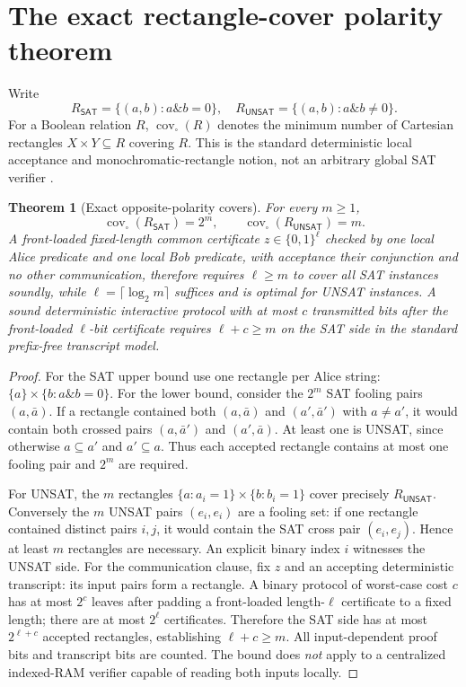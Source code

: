 \documentclass[11pt]{article}
\newtheorem{theorem}{Theorem}
\newcommand{\SAT}{\mathsf{SAT}}
\newcommand{\UNSAT}{\mathsf{UNSAT}}
\begin{document}
\section{The exact rectangle-cover polarity theorem}
Write
\[
R_{\SAT}=\{(a,b):a\mathbin{\&}b=0\},\quad
R_{\UNSAT}=\{(a,b):a\mathbin{\&}b\ne0\}.
\]
For a Boolean relation $R$, $\operatorname{cov}_{\square}(R)$ denotes the minimum number of Cartesian rectangles $X\times Y\subseteq R$ covering $R$. This is the standard deterministic local acceptance and monochromatic-rectangle notion, not an arbitrary global SAT verifier \cite{KarchmerKushilevitzNisan1995}.
\begin{theorem}[Exact opposite-polarity covers]\label{th:rect}
For every $m\ge1$,
\[
\boxed{\operatorname{cov}_{\square}(R_{\SAT})=2^m,\qquad
\operatorname{cov}_{\square}(R_{\UNSAT})=m.}\tag{3}
\]
A front-loaded fixed-length common certificate $z\in\{0,1\}^{\ell}$ checked by one local Alice predicate and one local Bob predicate, with acceptance their conjunction and no other communication, therefore requires $\ell\ge m$ to cover \emph{all SAT} instances soundly, while $\ell=\lceil\log_2m\rceil$ suffices and is optimal for \emph{UNSAT} instances. A sound deterministic interactive protocol with at most $c$ transmitted bits after the front-loaded $\ell$-bit certificate requires $\ell+c\ge m$ on the SAT side in the standard prefix-free transcript model.
\end{theorem}
\begin{proof}
For the SAT upper bound use one rectangle per Alice string:
$\{a\}\times\{b:a\mathbin{\&}b=0\}$. For the lower bound, consider the $2^m$ SAT fooling pairs $(a,\bar a)$. If a rectangle contained both $(a,\bar a)$ and $(a',\bar a')$ with $a\ne a'$, it would contain both crossed pairs $(a,\bar a')$ and $(a',\bar a)$. At least one is UNSAT, since otherwise $a\subseteq a'$ and $a'\subseteq a$. Thus each accepted rectangle contains at most one fooling pair and $2^m$ are required.

For UNSAT, the $m$ rectangles
$\{a:a_i=1\}\times\{b:b_i=1\}$ cover precisely $R_{\UNSAT}$. Conversely the $m$ UNSAT pairs $(e_i,e_i)$ are a fooling set: if one rectangle contained distinct pairs $i,j$, it would contain the SAT cross pair $(e_i,e_j)$. Hence at least $m$ rectangles are necessary. An explicit binary index $i$ witnesses the UNSAT side. For the communication clause, fix $z$ and an accepting deterministic transcript: its input pairs form a rectangle. A binary protocol of worst-case cost $c$ has at most $2^c$ leaves after padding a front-loaded length-$\ell$ certificate to a fixed length; there are at most $2^\ell$ certificates. Therefore the SAT side has at most $2^{\ell+c}$ accepted rectangles, establishing $\ell+c\ge m$. All input-dependent proof bits and transcript bits are counted. The bound does \emph{not} apply to a centralized indexed-RAM verifier capable of reading both inputs locally.
\end{proof}
\end{document}
